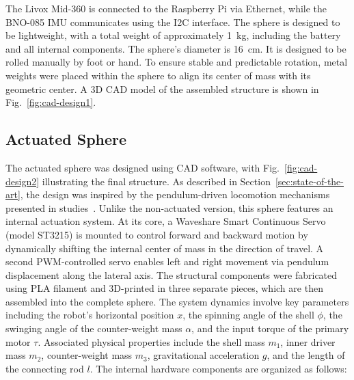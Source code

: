 \documentclass[conference]{IEEEtran}
\begin{document}
The Livox Mid-360 is connected to the Raspberry Pi via Ethernet, while the BNO-085 IMU communicates using the I2C interface. 
The sphere is designed to be lightweight, with a total weight of approximately \SI{1}{\kilo\gram}, including the battery and all internal components. 
The sphere's diameter is \SI{16}{\centi\meter}. 
It is designed to be rolled manually by foot or hand.
To ensure stable and predictable rotation, metal weights were placed within the sphere to align its center of mass with its geometric center. 
A 3D CAD model of the assembled structure is shown in Fig.~\ref{fig:cad-design1}.



\subsection{Actuated Sphere}

The actuated sphere was designed using CAD software, with Fig.~\ref{fig:cad-design2} illustrating the final structure. 
As described in Section~\ref{sec:state-of-the-art}, the design was inspired by the pendulum-driven locomotion mechanisms presented in studies~\cite{roboball, novelsphere}.
Unlike the non-actuated version, this sphere features an internal actuation system. 
At its core, a Waveshare Smart Continuous Servo (model ST3215) is mounted to control forward and backward motion by dynamically shifting the internal center of mass in the direction of travel. 
A second PWM-controlled servo enables left and right movement via pendulum displacement along the lateral axis.
The structural components were fabricated using PLA filament and 3D-printed in three separate pieces, which are then assembled into the complete sphere.
The system dynamics involve key parameters including the robot’s horizontal position \( x \), the spinning angle of the shell \( \phi \), the swinging angle of the counter-weight mass \( \alpha \), and the input torque of the primary motor \( \tau \). 
Associated physical properties include the shell mass \( m_1 \), inner driver mass \( m_2 \), counter-weight mass \( m_3 \), gravitational acceleration \( g \), and the length of the connecting rod \( l \). 
The internal hardware components are organized as follows:
\end{document}
